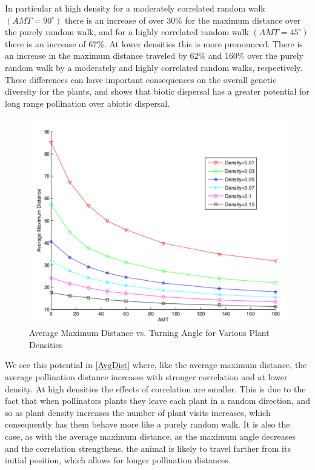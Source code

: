 In particular at high density for a moderately correlated random walk
$(AMT=90^{\circ})$ there is an increase of over 30\% for the maximum distance
over the purely random walk, and for a highly correlated random walk
$(AMT=45^{\circ})$ there is an increase of 67\%.  At lower densities this is
more pronounced.  There is an increase in the maximum distance traveled by 62\%
and 160\% over the purely random walk by a moderately and highly correlated
random walks, respectively. These differences can have important consequences on
the overall genetic diversity for the plants, and shows that biotic dispersal
has a greater potential for long range pollination over abiotic
dispersal.

\begin{figure}
  \begin{center}
  \includegraphics[scale=0.5]{Figures/MaxDVsAMT.pdf}
  \end{center}
  \caption{\small Average Maximum Distance vs. Turning Angle for Various Plant Densities}
  \label{AvgMaxDBees}
\end{figure}

We see this potential in \cref{AvgDist} where, like the average maximum
distance, the average pollination distance increases with stronger correlation
and at lower density.  At high densities the effects of correlation are smaller.
This is due to the fact that when pollinators plants they leave each
plant in a random direction, and so as plant density increases the number of
plant visits increases, which consequently has them behave more like a
purely random walk.  It is also the case, as with the average maximum distance,
as the maximum angle decreases and the correlation strengthens, the animal is
likely to travel farther from its initial position, which allows for longer
pollination distances.

